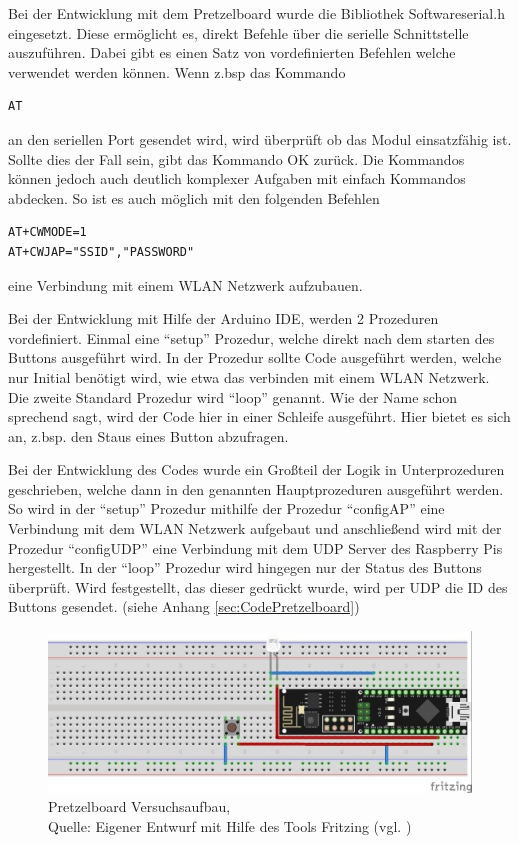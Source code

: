 Bei der Entwicklung mit dem Pretzelboard wurde die Bibliothek Softwareserial.h eingesetzt.
Diese ermöglicht es, direkt Befehle über die serielle Schnittstelle auszuführen.
Dabei gibt es einen Satz von vordefinierten Befehlen welche verwendet werden können.
Wenn z.bsp das Kommando 
\begin{lstlisting}
AT
\end{lstlisting}
an den seriellen Port gesendet wird, wird überprüft ob das Modul einsatzfähig ist.
Sollte dies der Fall sein, gibt das Kommando OK zurück.
Die Kommandos können jedoch auch deutlich komplexer Aufgaben mit einfach Kommandos abdecken.
So ist es auch möglich mit den folgenden Befehlen
\begin{lstlisting}
AT+CWMODE=1
AT+CWJAP="SSID","PASSWORD"
\end{lstlisting}
eine Verbindung mit einem WLAN Netzwerk aufzubauen.

Bei der Entwicklung mit Hilfe der Arduino IDE, werden 2 Prozeduren vordefiniert.
Einmal eine "`setup"' Prozedur, welche direkt nach dem starten des Buttons ausgeführt wird.
In der Prozedur sollte Code ausgeführt werden, welche nur Initial benötigt wird, wie etwa das verbinden mit einem WLAN Netzwerk.
Die zweite Standard Prozedur wird "`loop"' genannt.
Wie der Name schon sprechend sagt, wird der Code hier in einer Schleife ausgeführt.
Hier bietet es sich an, z.bsp. den Staus eines Button abzufragen.

Bei der Entwicklung des Codes wurde ein Großteil der Logik in Unterprozeduren geschrieben, welche dann in den genannten Hauptprozeduren ausgeführt werden.
So wird in der "`setup"' Prozedur mithilfe der Prozedur "`configAP"' eine Verbindung mit dem WLAN Netzwerk aufgebaut und anschließend wird mit der Prozedur "`configUDP"' eine Verbindung mit dem UDP Server des Raspberry Pis hergestellt.
In der "`loop"' Prozedur wird hingegen nur der Status des Buttons überprüft.
Wird festgestellt, das dieser gedrückt wurde, wird per UDP die ID des Buttons gesendet. 
(siehe Anhang \ref{sec:CodePretzelboard})

\begin{figure}[H]
	\centering
	\includegraphics[scale=1.5]{Pretzel_Fritzing.jpg}
	\caption[Pretzelboard Versuchsaufbau]{Pretzelboard Versuchsaufbau,\\ Quelle: Eigener Entwurf mit Hilfe des Tools Fritzing (vgl. \cite{.fritz})}
\end{figure}